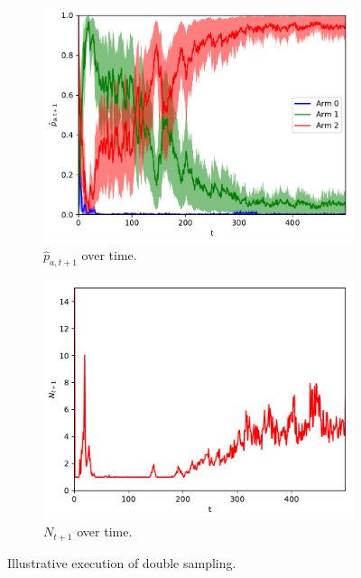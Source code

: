 \documentclass{article}
\begin{document}
\begin{figure}[!h]
	\centering
	\begin{subfigure}[b]{0.49\textwidth}
		\includegraphics[width=\textwidth]{./figs/bernoulli/pred_action_density.pdf}
		\caption{$\hat{p}_{a,t+1}$ over time.}
		\label{fig:pred_action_density}
	\end{subfigure}%
	\begin{subfigure}[b]{0.49\textwidth}
		\includegraphics[width=\textwidth]{./figs/bernoulli/n_samples.pdf}
		\caption{$N_{t+1}$ over time.}
		\label{fig:n_samples}
	\end{subfigure}
	\caption{Illustrative execution of double sampling.}
	\label{fig:approach_intuition}
\end{figure}
\end{document}
